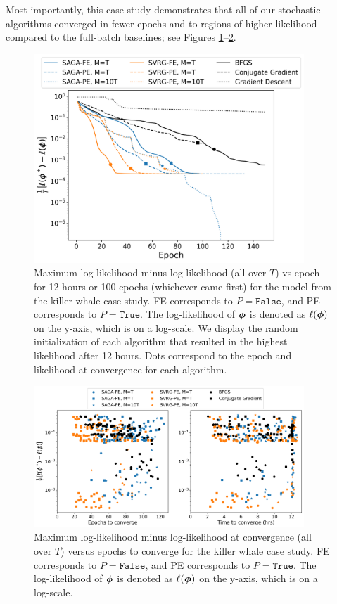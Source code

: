 Most importantly, this case study demonstrates that all of our stochastic algorithms converged in fewer epochs and to regions of higher likelihood compared to the full-batch baselines; see Figures \ref{fig:ll_trace_case}--\ref{fig:scatterplot_case}.

\begin{figure}%
    \centering
    \includegraphics[width=4in]{../plt/log-like_v_epoch_K-3-3.png}
    \caption{
    Maximum log-likelihood minus log-likelihood (all over $T$) vs epoch for 12 hours or 100 epochs (whichever came first) for the model from the killer whale case study. FE corresponds to $P = \texttt{False}$, and PE corresponds to $P = \texttt{True}$. The log-likelihood of $\boldsymbol{\phi}$ is denoted as $\ell(\boldsymbol{\phi})$ on the y-axis, which is on a log-scale. We display the random initialization of each algorithm that resulted in the highest likelihood after 12 hours. Dots correspond to the epoch and likelihood at convergence for each algorithm.
    }
    \label{fig:ll_trace_case}
\end{figure}
%
\begin{figure}%
    \centering
    \includegraphics[width=4in]{../plt/scatterplot_case_study.png}
    \caption{Maximum log-likelihood minus log-likelihood at convergence (all over $T$) versus epochs to converge for the killer whale case study. FE corresponds to $P = \texttt{False}$, and PE corresponds to $P = \texttt{True}$. The log-likelihood of $\boldsymbol{\phi}$ is denoted as $\ell(\boldsymbol{\phi})$ on the y-axis, which is on a log-scale.}
    \label{fig:scatterplot_case}
\end{figure}
